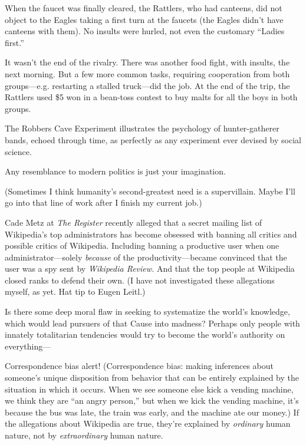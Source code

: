 {
 When the faucet was finally cleared, the Rattlers, who had
canteens, did not object to the Eagles taking a first turn at the
faucets (the Eagles didn't have canteens with them). No
insults were hurled, not even the customary ``Ladies
first.''}

{
 It wasn't the end of the rivalry. There was
another food fight, with insults, the next morning. But a few more
common tasks, requiring cooperation from both groups---e.g. restarting
a stalled truck---did the job. At the end of the trip, the Rattlers
used \$5 won in a bean-toss contest to buy malts for all the boys in
both groups.}

{
 The Robbers Cave Experiment illustrates the psychology of
hunter-gatherer bands, echoed through time, as perfectly as any
experiment ever devised by social science.}

{
 Any resemblance to modern politics is just your imagination.}

{
 (Sometimes I think humanity's second-greatest need
is a supervillain. Maybe I'll go into that line of work
after I finish my current job.)}

\myendsectiontext


\bigskip


{
 Cade Metz at \textit{The Register} recently alleged that a secret
mailing list of Wikipedia's top administrators has
become obsessed with banning all critics and possible critics of
Wikipedia. Including banning a productive user when one
administrator---solely \textit{because} of the productivity---became
convinced that the user was a spy sent by \textit{Wikipedia Review.}
And that the top people at Wikipedia closed ranks to defend their own.
(I have not investigated these allegations myself, as yet. Hat tip to
Eugen Leitl.) }

{
 Is there some deep moral flaw in seeking to systematize the
world's knowledge, which would lead pursuers of that
Cause into madness? Perhaps only people with innately totalitarian
tendencies would try to become the world's authority on
everything---}

{
 Correspondence bias alert! (Correspondence bias: making inferences
about someone's unique disposition from behavior that
can be entirely explained by the situation in which it occurs. When we
see someone else kick a vending machine, we think they are
``an angry person,'' but when we
kick the vending machine, it's because the bus was
late, the train was early, and the machine ate our money.) If the
allegations about Wikipedia are true, they're explained
by \textit{ordinary} human nature, not by \textit{extraordinary} human
nature.}

